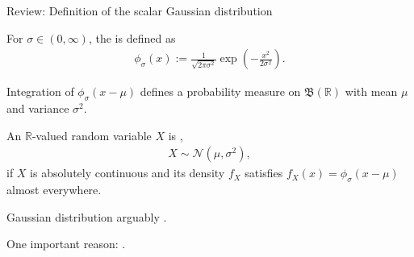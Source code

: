\begin{frame}{Review: Definition of the scalar Gaussian distribution}
\bit
\item For $\sigma\in(0,\infty)$, the  is defined as 
\begin{align*}
\phi_{\sigma}(x):=\frac{1}{\sqrt{2\pi\sigma^2}}\exp\left(-\frac{x^2}{2\sigma^2}\right).
\end{align*}
\item Integration of $\phi_{\sigma}(x-\mu)$ defines a probability measure on $\mathfrak{B}(\mathbb{R})$ with mean $\mu$ and variance $\sigma^2$. 
\eit

\bit
\item An $\mathbb{R}$-valued random variable $X$ is , 
\begin{align*}
X\sim \mathcal{N}(\mu,\sigma^2), 
\end{align*}
if 
$X$ is absolutely continuous and its density $f_X$ satisfies $f_X(x)=\phi_{\sigma}(x-\mu)$ almost everywhere.
\item Gaussian distribution arguably . 
\item One important  reason: . 
\eit
\end{frame}









